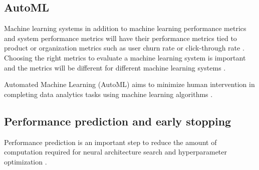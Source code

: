 \subsection{AutoML}

Machine learning systems in addition to machine learning performance metrics and system performance metrics will have their performance metrics tied to product or organization metrics such as user churn rate or click-through rate \parencite{shankarOperationalizingMachineLearning2022}. Choosing the right metrics to evaluate a machine learning system is important and the metrics will be different for different machine learning systems \parencite{shankarOperationalizingMachineLearning2022}.

Automated Machine Learning (AutoML) aims to minimize human intervention in completing data analytics tasks using machine learning algorithms \parencite{yangIoTDataAnalytics2022}.

\subsection{Performance prediction and early stopping}

Performance prediction is an important step to reduce the amount of computation required for neural architecture search and hyperparameter optimization \parencite{bakerAcceleratingNeuralArchitecture2017}.